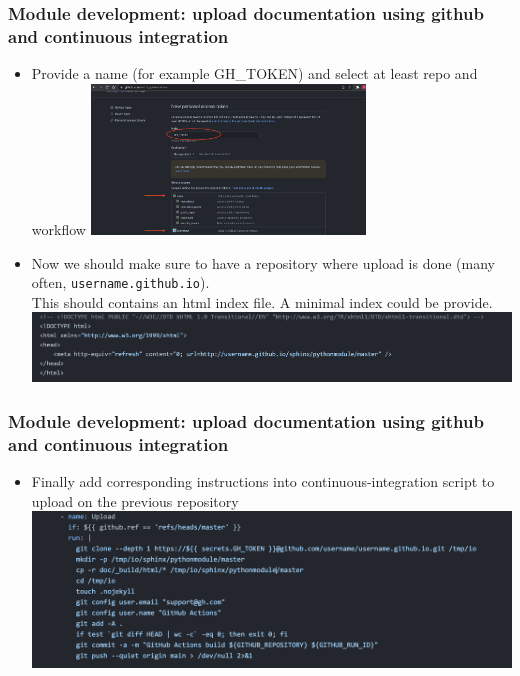 \documentclass[8pt]{beamer}
\begin{document}
\begin{frame}
  \frametitle{Module development: upload documentation using github and continuous integration}
    \begin{itemize}
      \item Provide a name (for example GH\_TOKEN) and select at least repo and workflow
     \includegraphics[width=8.cm, height=4cm]{new_token.png}
      \item Now we should make sure to have a repository where upload is done (many often, \texttt{username.github.io}).\\
       This should contains an html index file. A minimal index could be provide.
       \includegraphics[width=11.cm]{index_minimal.png}
      \end{itemize}
\end{frame}

\begin{frame}
  \frametitle{Module development: upload documentation using github and continuous integration}
    \begin{itemize} 
      \item Finally add corresponding instructions into continuous-integration script to upload on the previous repository
      \includegraphics[width=11.cm]{instruction_ci.png}
    \end{itemize}
\end{frame}
\end{document}
